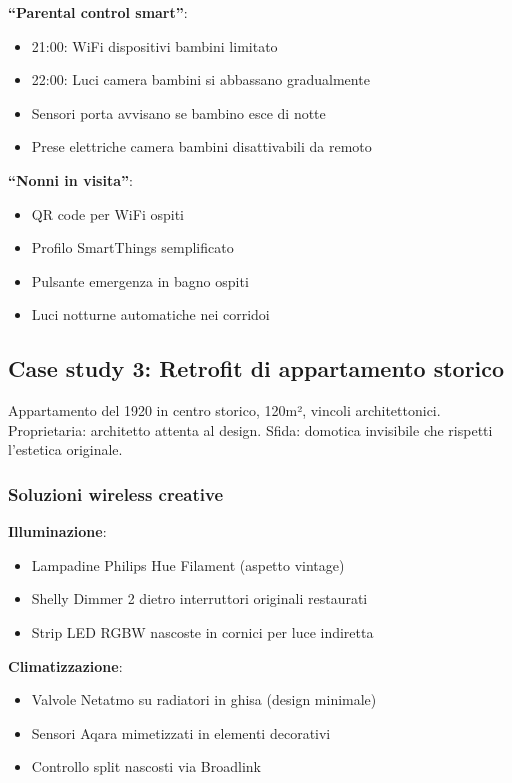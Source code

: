 \textbf{``Parental control smart''}:
\begin{itemize}
    \item 21:00: WiFi dispositivi bambini limitato
    \item 22:00: Luci camera bambini si abbassano gradualmente
    \item Sensori porta avvisano se bambino esce di notte
    \item Prese elettriche camera bambini disattivabili da remoto
\end{itemize}

\textbf{``Nonni in visita''}:
\begin{itemize}
    \item QR code per WiFi ospiti
    \item Profilo SmartThings semplificato
    \item Pulsante emergenza in bagno ospiti
    \item Luci notturne automatiche nei corridoi
\end{itemize}

\subsection{Case study 3: Retrofit di appartamento storico}

Appartamento del 1920 in centro storico, 120m², vincoli architettonici. Proprietaria: architetto attenta al design. Sfida: domotica invisibile che rispetti l'estetica originale.

\subsubsection{Soluzioni wireless creative}

\textbf{Illuminazione}:
\begin{itemize}
    \item Lampadine Philips Hue Filament (aspetto vintage)
    \item Shelly Dimmer 2 dietro interruttori originali restaurati
    \item Strip LED RGBW nascoste in cornici per luce indiretta
\end{itemize}

\textbf{Climatizzazione}:
\begin{itemize}
    \item Valvole Netatmo su radiatori in ghisa (design minimale)
    \item Sensori Aqara mimetizzati in elementi decorativi
    \item Controllo split nascosti via Broadlink
\end{itemize}

